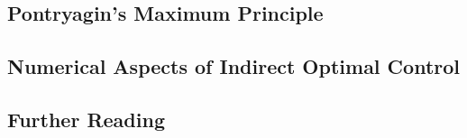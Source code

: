 
\subsection{Pontryagin's Maximum Principle}



\subsection{Numerical Aspects of Indirect Optimal Control}



\subsection{Further Reading}